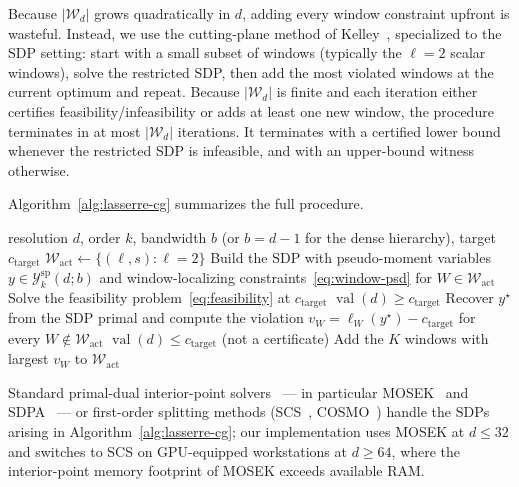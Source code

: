 \documentclass[11pt, letterpaper]{article}
\theoremstyle{paperplain}
\theoremstyle{paperdef}
\newcommand{\val}{\operatorname{val}}
\begin{document}
Because $|\mathcal{W}_d|$ grows quadratically in $d$, adding every
window constraint upfront is wasteful.  Instead, we use the
cutting-plane method of Kelley~\cite{Kelley1960}, specialized to the
SDP setting: start with a small subset of windows (typically the
$\ell=2$ scalar windows), solve the restricted SDP, then add the
most violated windows at the current optimum and repeat.  Because
$|\mathcal{W}_d|$ is finite and each iteration either certifies
feasibility/infeasibility or adds at least one new window, the
procedure terminates in at most $|\mathcal{W}_d|$ iterations.  It
terminates with a certified lower bound whenever the restricted SDP
is infeasible, and with an upper-bound witness otherwise.

Algorithm~\ref{alg:lasserre-cg} summarizes the full procedure.

\begin{algorithm}[H]
\caption{Lasserre SDP Lower Bound with Constraint Generation}
\label{alg:lasserre-cg}
\begin{algorithmic}[1]
\Require resolution $d$, order $k$, bandwidth $b$ (or $b=d-1$ for the
  dense hierarchy), target $c_{\mathrm{target}}$
\State $\mathcal{W}_{\text{act}}\gets \{(\ell,s): \ell=2\}$
\Loop
  \State Build the SDP with pseudo-moment variables
    $y\in\mathcal{Y}_k^{\mathrm{sp}}(d;b)$ and window-localizing
    constraints~\eqref{eq:window-psd} for $W\in\mathcal{W}_{\text{act}}$
  \State Solve the feasibility problem~\eqref{eq:feasibility} at
    $c_{\mathrm{target}}$
   \Return {}
    $\val(d)\ge c_{\mathrm{target}}$
  \EndIf
  \State Recover $y^\star$ from the SDP primal and compute the
    violation
    $v_W = \ell_W(y^\star) - c_{\mathrm{target}}$ for every
    $W\notin\mathcal{W}_{\text{act}}$
    \Return {} $\val(d)\le c_{\mathrm{target}}$
      (not a certificate)
  \EndIf
  \State Add the $K$ windows with largest $v_W$ to
    $\mathcal{W}_{\text{act}}$
\EndLoop
\end{algorithmic}
\end{algorithm}

Standard primal-dual interior-point
solvers~\cite{VandenbergheBoyd1996,BenTalNemirovski2001} ---
in particular MOSEK~\cite{MOSEK} and SDPA~\cite{SDPA} ---
or first-order splitting methods (SCS~\cite{SCS}, COSMO~\cite{COSMO})
handle the SDPs arising in Algorithm~\ref{alg:lasserre-cg}; our implementation uses MOSEK at
$d\le 32$ and switches to SCS on GPU-equipped workstations at
$d\ge 64$, where the interior-point memory footprint of MOSEK exceeds
available RAM.
\end{document}
